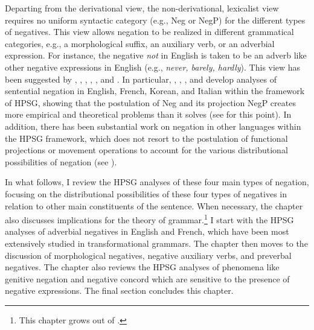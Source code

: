 \documentclass[output=paper
                ,modfonts
                		,nonflat
	        ,collection
	        ,collectionchapter
	        ,collectiontoclongg
 	        ,biblatex
                ,babelshorthands
                ,newtxmath
                ,draftmode
                ,colorlinks, citecolor=brown
]{./langsci/langscibook}
\begin{document}
{Departing from the derivational view, the non-derivational, lexicalist view
requires no uniform syntactic category (e.g., Neg or NegP) for the different types of negatives. This view allows negation to be realized in different grammatical categories, e.g., a morphological suffix, an auxiliary verb, or an adverbial expression. For instance, the negative {\it not} in English is taken to be an adverb like other negative expressions in English (e.g., \textit{never, barely, hardly}). This view has been suggested by \citet{Jackendoff:72}, \citet{Baker:91}, \citet{Ernst:92}, \citet{AG:97}, \citet{Kim:00}, and \citet{Warner2000a-u}. In particular,
\citet{KS:96}, \citet{AG:97}, \citet{Kim:00}, and \citet{KS:02} develop analyses of sentential negation in English, French, Korean, and Italian within the framework of HPSG, showing that the postulation of Neg and its projection NegP creates more empirical and theoretical problems than it solves (see \citealt{Newmeyer:2006} for this point).
In addition, there has been substantial work on negation in other languages within the HPSG framework, which
does not resort to the postulation of functional projections or movement operations to account for the various distributional possibilities
of negation (see \citealt{PK:99, BJ:00, Prz:00, Kupsc:02, Swart:02, Borsley:05, Crysmann:10, Bender:13}).

In what follows, I review the HPSG analyses of these four main types of negation,
focusing on the distributional possibilities of these four types of negatives in
relation to other main constituents of the sentence. When
necessary, the chapter also discusses implications for
the theory of grammar.\footnote{This chapter grows out of \citet{Kim:00,18}.} I
start with the HPSG analyses of adverbial negatives in English and French, which have been most extensively studied in transformational grammars.
The chapter then moves to the discussion of morphological
negatives, negative auxiliary verbs, and preverbal negatives. The chapter
also reviews the HPSG analyses of phenomena like genitive negation and
negative concord which are sensitive to the presence of negative expressions. The
final section concludes this chapter.


}
\end{document}

